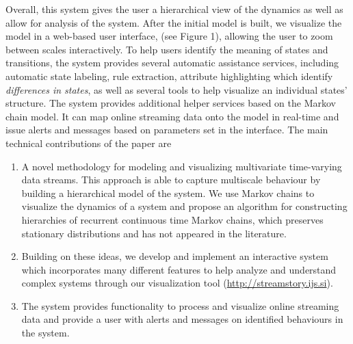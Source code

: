Overall, this system gives the user a hierarchical view of the dynamics as well as 
allow for analysis of the system. After the initial model is built, we visualize the model
in a web-based user interface, (see Figure 1), allowing the 
user to zoom between scales interactively. To help users identify the
meaning of states and transitions, the system provides several automatic assistance services,
including automatic state labeling, rule extraction, attribute highlighting which
identify \emph{differences in states}, as well as several tools to help visualize an individual states'
structure. 
%
The system provides additional helper  services based on the Markov chain model. It can map online streaming data onto 
the model in real-time and issue alerts and messages based on parameters set in the interface. %
%
The main technical contributions of the paper are
\begin{enumerate}{}
  \item A novel methodology for modeling and visualizing multivariate time-varying data streams. This approach is able to capture multiscale behaviour by building a hierarchical model of the system. We use Markov chains to visualize the dynamics of a system and propose an algorithm for constructing hierarchies of recurrent continuous time Markov chains, which preserves stationary distributions and has not appeared in the literature. %
  \item Building on these ideas, we develop and implement an interactive system which incorporates many different features to help analyze and understand complex systems through our visualization tool (\url{http://streamstory.ijs.si}).
  \item The system provides functionality to process and visualize online streaming data and provide a user with  alerts and messages on identified behaviours in the system.  
\end{enumerate}



